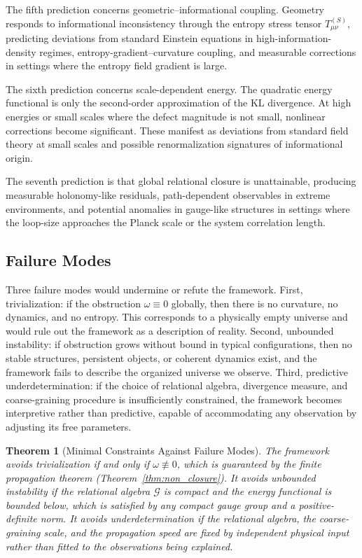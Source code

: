 \documentclass[12pt,a4paper,openany]{book}
\theoremstyle{plain}
\newtheorem{theorem}{Theorem}[chapter]
\theoremstyle{definition}
\theoremstyle{remark}
\begin{document}
The fifth prediction concerns geometric--informational coupling. Geometry responds to informational inconsistency through the entropy stress tensor $T_{\mu\nu}^{(S)}$, predicting deviations from standard Einstein equations in high-information-density regimes, entropy-gradient--curvature coupling, and measurable corrections in settings where the entropy field gradient is large.

The sixth prediction concerns scale-dependent energy. The quadratic energy functional is only the second-order approximation of the KL divergence. At high energies or small scales where the defect magnitude is not small, nonlinear corrections become significant. These manifest as deviations from standard field theory at small scales and possible renormalization signatures of informational origin.

The seventh prediction is that global relational closure is unattainable, producing measurable holonomy-like residuals, path-dependent observables in extreme environments, and potential anomalies in gauge-like structures in settings where the loop-size approaches the Planck scale or the system correlation length.

\subsection{Failure Modes}

Three failure modes would undermine or refute the framework. First, trivialization: if the obstruction $\omega \equiv 0$ globally, then there is no curvature, no dynamics, and no entropy. This corresponds to a physically empty universe and would rule out the framework as a description of reality. Second, unbounded instability: if obstruction grows without bound in typical configurations, then no stable structures, persistent objects, or coherent dynamics exist, and the framework fails to describe the organized universe we observe. Third, predictive underdetermination: if the choice of relational algebra, divergence measure, and coarse-graining procedure is insufficiently constrained, the framework becomes interpretive rather than predictive, capable of accommodating any observation by adjusting its free parameters.

\begin{theorem}[Minimal Constraints Against Failure Modes]
The framework avoids trivialization if and only if $\omega \not\equiv 0$, which is guaranteed by the finite propagation theorem (Theorem~\ref{thm:non_closure}). It avoids unbounded instability if the relational algebra $\mathcal{G}$ is compact and the energy functional is bounded below, which is satisfied by any compact gauge group and a positive-definite norm. It avoids underdetermination if the relational algebra, the coarse-graining scale, and the propagation speed are fixed by independent physical input rather than fitted to the observations being explained.
\end{theorem}
\end{document}
